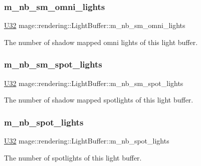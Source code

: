 \subsubsection{\texorpdfstring{m\+\_\+nb\+\_\+sm\+\_\+omni\+\_\+lights}{m\_nb\_sm\_omni\_lights}}
{\footnotesize\ttfamily \hyperlink{namespacemage_a41c104c036fba3756a74e19f793eeaa1}{U32} mage\+::rendering\+::\+Light\+Buffer\+::m\+\_\+nb\+\_\+sm\+\_\+omni\+\_\+lights}

The number of shadow mapped omni lights of this light buffer. \hypertarget{structmage_1_1rendering_1_1_light_buffer_a78481c98c9efcdf18ae1254d1fe6f776}{}\label{structmage_1_1rendering_1_1_light_buffer_a78481c98c9efcdf18ae1254d1fe6f776} 
\subsubsection{\texorpdfstring{m\+\_\+nb\+\_\+sm\+\_\+spot\+\_\+lights}{m\_nb\_sm\_spot\_lights}}
{\footnotesize\ttfamily \hyperlink{namespacemage_a41c104c036fba3756a74e19f793eeaa1}{U32} mage\+::rendering\+::\+Light\+Buffer\+::m\+\_\+nb\+\_\+sm\+\_\+spot\+\_\+lights}

The number of shadow mapped spotlights of this light buffer. \hypertarget{structmage_1_1rendering_1_1_light_buffer_aef25432813d6531689ff6a94e4cf6fcb}{}\label{structmage_1_1rendering_1_1_light_buffer_aef25432813d6531689ff6a94e4cf6fcb} 
\subsubsection{\texorpdfstring{m\+\_\+nb\+\_\+spot\+\_\+lights}{m\_nb\_spot\_lights}}
{\footnotesize\ttfamily \hyperlink{namespacemage_a41c104c036fba3756a74e19f793eeaa1}{U32} mage\+::rendering\+::\+Light\+Buffer\+::m\+\_\+nb\+\_\+spot\+\_\+lights}

The number of spotlights of this light buffer. \hypertarget{structmage_1_1rendering_1_1_light_buffer_a2e4d47ce07261e4ce1c5bd6a9418bea6}{}\label{structmage_1_1rendering_1_1_light_buffer_a2e4d47ce07261e4ce1c5bd6a9418bea6} 
